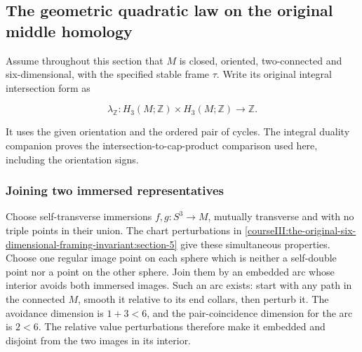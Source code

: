 \subsection{The geometric quadratic law on the original middle homology}
\label{courseIII:the-original-six-dimensional-framing-invariant:framed-six-quadratic-law}

\label{courseIII:the-original-six-dimensional-framing-invariant:section-6}\label{courseIII:framed6:6}

Assume throughout this section that \(M\) is closed, oriented, two-connected and six-dimensional, with the specified stable frame \(\tau\). Write its original integral intersection form as

\begin{equation}
\lambda_{\mathbb Z}:H_3(M;\mathbb Z)\times H_3(M;\mathbb Z)
                       \longrightarrow\mathbb Z.
 \label{courseIII:the-original-six-dimensional-framing-invariant:eq:6.1}
\end{equation}

It uses the given orientation and the ordered pair of cycles. The integral duality companion proves the intersection-to-cap-product comparison used here, including the orientation signs.

\subsubsection{Joining two immersed representatives}
\label{courseIII:the-original-six-dimensional-framing-invariant:section-6.1}

Choose self-transverse immersions \(f,g:S^3\to M\), mutually transverse and with no triple points in their union. The chart perturbations in \cref{courseIII:the-original-six-dimensional-framing-invariant:section-5} give these simultaneous properties. Choose one regular image point on each sphere which is neither a self-double point nor a point on the other sphere. Join them by an embedded arc whose interior avoids both immersed images. Such an arc exists: start with any path in the connected \(M\), smooth it relative to its end collars, then perturb it. The avoidance dimension is \(1+3<6\), and the pair-coincidence dimension for the arc is \(2<6\). The relative value perturbations therefore make it embedded and disjoint from the two images in its interior.

